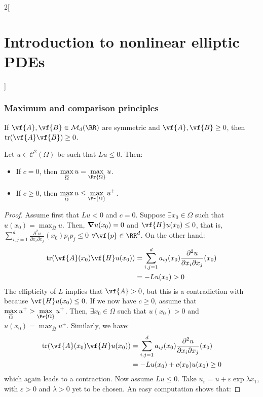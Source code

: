 \documentclass[../../../main_math.tex]{subfiles}
\begin{document}
\begin{multicols}{2}[\section{Introduction to nonlinear elliptic PDEs}]
  \subsubsection{Maximum and comparison principles}
  \begin{lemma}\label{INEPDE:lemma_matrices_max_principle}
    If $\vf{A},\vf{B}\in \mathcal{M}_d(\RR)$ are symmetric and $\vf{A}, \vf{B}\geq 0$, then $\tr(\vf{A}\vf{B})\geq 0$.
  \end{lemma}
  \begin{theorem}\label{INEPDE:weak_max_principle_nondiv}
    Let $u\in \mathcal{C}^2(\Omega)$ be such that $Lu\leq 0$. Then:
    \begin{itemize}
      \item If $c=0$, then $\displaystyle \max_{\overline{\Omega}}u=\max_{\Fr{\Omega}}u$.
      \item If $c\geq 0$, then $\displaystyle \max_{\overline{\Omega}}u\leq \max_{\Fr{\Omega}}u^+$.
    \end{itemize}
  \end{theorem}
  \begin{proof}
    Assume first that $Lu<0$ and $c=0$. Suppose $\exists x_0\in \Omega$ such that $u(x_0)=\max_{\overline{\Omega}}u$. Then, $\grad u(x_0)=0$ and $\vf{H}u(x_0)\leq0$, that is, $\sum_{i,j=1}^d\frac{\partial^2u}{\partial x_i\partial x_j}(x_0)p_ip_j\leq 0$ $\forall \vf{p}\in\RR^d$. On the other hand:
    \begin{align*}
      \trace(\vf{A}(x_0)\vf{H}u(x_0)) & = \sum_{i,j=1}^d a_{ij}(x_0)\frac{\partial^2u}{\partial x_i\partial x_j}(x_0) \\
                                      & =-Lu(x_0)>0
    \end{align*}
    The ellipticity of $L$ implies that $\vf{A}>0$, but this is a contradiction with  because $\vf{H}u(x_0)\leq 0$. If we now have $c\geq 0$, assume that $\displaystyle \max_{\overline{\Omega}}u^+> \max_{\Fr{\Omega}}u^+$. Then, $\exists x_0\in \Omega$ such that $u(x_0)>0$ and $u(x_0)=\max_{\overline{\Omega}}u^+$. Similarly, we have:
    \begin{align*}
      \trace(\vf{A}(x_0)\vf{H}u(x_0)) & = \sum_{i,j=1}^d a_{ij}(x_0)\frac{\partial^2u}{\partial x_i\partial x_j}(x_0) \\
                                      & =-Lu(x_0) + c(x_0)u(x_0)\geq 0
    \end{align*}
    which again leads to a contraction. Now assume $Lu\leq 0$. Take $u_\varepsilon=u+\varepsilon \exp{\lambda x_1}$, with $\varepsilon>0$ and $\lambda>0$ yet to be chosen. An easy computation shows that:

\end{proof}
\end{multicols}
\end{document}

